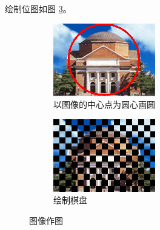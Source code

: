 \documentclass[a4paper]{article}  %
\begin{document}
绘制位图如图 \ref{fig:1_2_chess}。

\begin{figure}[ht]
    \centering
    \begin{subfigure}[b]{0.4\textwidth}
        \centering
        \includegraphics[width=\textwidth]{asserts/1_2_circle.png}
        \caption{
            以图像的中心点为圆心画圆
        }\label{fig:1_2_circle}
    \end{subfigure}
    \hfill
    \begin{subfigure}[b]{0.4\textwidth}
        \centering
        \includegraphics[width=\textwidth]{asserts/1_2_chess.png}
        \caption{
            绘制棋盘
        }\label{fig:1_2_chess}
    \end{subfigure}
    \caption{
        图像作图
    }
\end{figure}
\end{document}
